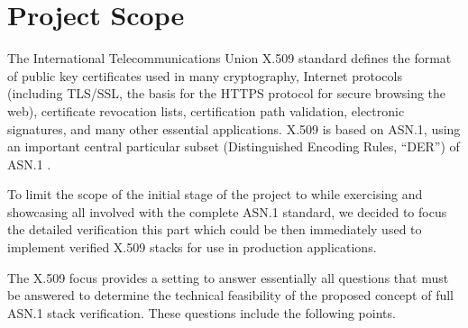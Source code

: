 \documentclass[acmsmall,nonacm]{acmart}
\begin{document}
\section{Project Scope}

The International Telecommunications Union X.509 standard
\cite{TODO:16} defines the format of public key certificates used in
many cryptography, Internet protocols (including TLS/SSL, the basis
for the HTTPS protocol for secure browsing the web), certificate
revocation lists, certification path validation, electronic
signatures, and many other essential applications. X.509 is based on
ASN.1, using an important central particular subset (Distinguished
Encoding Rules, ``DER'') of ASN.1 \cite{TODO:37}.

To limit the scope of the initial stage of the project to while
exercising and showcasing all involved with the complete ASN.1
standard, we decided to focus the detailed verification this part
which could be then immediately used to implement verified X.509
stacks for use in production applications.
 
The X.509 focus provides a setting to answer essentially all questions
that must be answered to determine the technical feasibility of the
proposed concept of full ASN.1 stack verification. These questions
include the following points.
\end{document}
